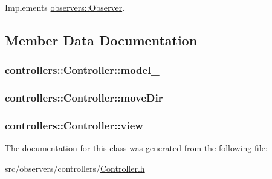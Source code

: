 \-Implements \hyperlink{classobservers_1_1Observer_a71872e29ecdc6a13a99afa39e536710c}{observers\-::\-Observer}.



\subsection{\-Member \-Data \-Documentation}
\hypertarget{classcontrollers_1_1Controller_a4238e40666b91a3f95a9459233037e0b}{
\subsubsection[{model\-\_\-}]{ {\bf controllers\-::\-Controller\-::model\-\_\-}}}\label{d4/d85/classcontrollers_1_1Controller_a4238e40666b91a3f95a9459233037e0b}
\hypertarget{classcontrollers_1_1Controller_a0bd9a0e7a7d6e7ef4ea4861e4e907016}{
\subsubsection[{move\-Dir\-\_\-}]{ {\bf controllers\-::\-Controller\-::move\-Dir\-\_\-}}}\label{d4/d85/classcontrollers_1_1Controller_a0bd9a0e7a7d6e7ef4ea4861e4e907016}
\hypertarget{classcontrollers_1_1Controller_ad15a9e80d35f43a394775ab8292ee561}{
\subsubsection[{view\-\_\-}]{ {\bf controllers\-::\-Controller\-::view\-\_\-}}}\label{d4/d85/classcontrollers_1_1Controller_ad15a9e80d35f43a394775ab8292ee561}


\-The documentation for this class was generated from the following file\-:\begin{DoxyCompactItemize}
\item 
src/observers/controllers/\hyperlink{Controller_8h}{\-Controller.\-h}\end{DoxyCompactItemize}
